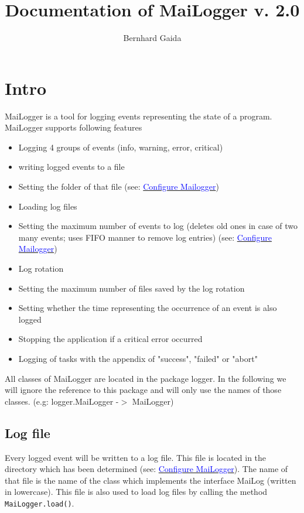 \documentclass{article}
\title{Documentation of MaiLogger v. 2.0}
\author{Bernhard Gaida}
\newcommand{\refh}[2]{\hyperref[#1] {\textcolor{blue}{#2}}}
\newcommand{\coB}[1]{\textcolor{blue}{#1}}
\begin{document}
\maketitle

\section{Intro}
\label{intro}
    MaiLogger is a tool for logging events representing the state of a program.
    MaiLogger supports following features
    \begin{itemize}
        \item Logging 4 groups of events (info, warning, error, critical)
        \item writing logged events to a file
        \item Setting the folder of that file (see: \hyperref[setup_mailogger.setup]{\coB{Configure Mailogger}})
        \item Loading log files
        \item Setting the maximum number of events to log (deletes old ones in case of two many events; uses FIFO manner to remove log entries) (see: \refh{setup_mailogger.setup}{Configure Mailogger})
        \item Log rotation
        \item Setting the maximum number of files saved by the log rotation
        \item Setting whether the time representing the occurrence of an event is also logged
        \item Stopping the application if a critical error occurred
        \item Logging of tasks with the appendix of "success", "failed" or "abort"
    \end{itemize}
    All classes of MaiLogger are located in the package logger.
    In the following we will ignore the reference to this package and will only use the names of those classes. (e.g: logger.MaiLogger -$>$ MaiLogger)

    \subsection{Log file}
    Every logged event will be written to a log file. This file is located in the directory which has been determined (see: \refh{setup_mailogger.setup}{Configure MaiLogger}).
    The name of that file is the name of the class which implements the interface MaiLog (written in lowercase).
    This file is also used to load log files by calling the method \lstinline|MaiLogger.load()|.
\end{document}
